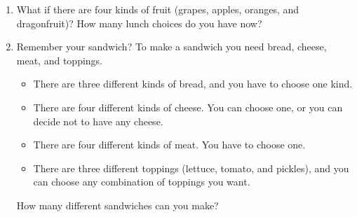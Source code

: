 \documentclass{article}
\begin{document}
\begin{enumerate}
\item What if there are four kinds of fruit (grapes, apples, oranges,
  and dragonfruit)?  How many lunch choices do you have now?


\newpage
\item Remember your sandwich?  To make a sandwich you need bread,
  cheese, meat, and toppings.
  \begin{itemize}
  \item There are three different kinds of bread, and you have to
    choose one kind.
  \item There are four different kinds of cheese. You can choose one,
    or you can decide not to have any cheese.
  \item There are four different kinds of meat.  You have to choose
    one.
  \item There are three different toppings (lettuce, tomato, and
    pickles), and you can choose any combination of toppings you want.
  \end{itemize}

  How many different sandwiches can you make?
\end{enumerate}
\end{document}
